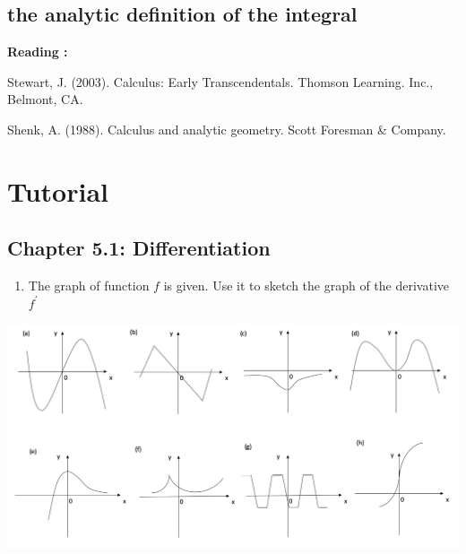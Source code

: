 \documentclass[]{book}
\providecommand{\tightlist}{%
  \setlength{\itemsep}{0pt}\setlength{\parskip}{0pt}}
\begin{document}
\hypertarget{the-analytic-definition-of-the-integral}{%
\subsection{the analytic definition of the integral}\label{the-analytic-definition-of-the-integral}}

\textbf{Reading :}

Stewart, J. (2003). Calculus: Early Transcendentals. Thomson Learning. Inc., Belmont, CA.

Shenk, A. (1988). Calculus and analytic geometry. Scott Foresman \& Company.

\newpage


\hypertarget{tutorial}{%
\section{Tutorial}\label{tutorial}}

\hypertarget{chapter-5.1-differentiation}{%
\subsection*{Chapter 5.1: Differentiation}\label{chapter-5.1-differentiation}}

\begin{enumerate}
\def\labelenumi{\arabic{enumi}.}
\tightlist
\item
  The graph of function \(f\) is given. Use it to sketch the graph of the derivative \(f^\prime\)
\end{enumerate}

\begin{center}\includegraphics[width=1\linewidth]{figure/5Derivatives-8} \end{center}
\end{document}
